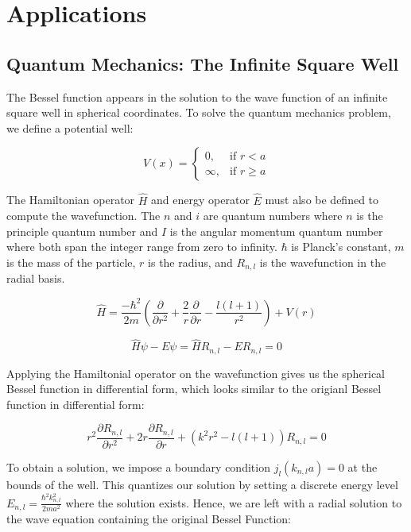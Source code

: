 \documentclass[linenumbers, RNAAS, trackchanges]{aastex631}
\begin{document}
\section{Applications} \label{sec:applications}

\subsection{Quantum Mechanics: The Infinite Square Well}
The Bessel function appears in the solution to the wave function of an infinite
square well in spherical coordinates. To solve the quantum mechanics problem, we
define a potential well:

\begin{equation}
    V(x)=
    \begin{cases}
        0, &\text{if }r < a\\
        \infty, &\text{if }r\geq a
    \end{cases}
\end{equation}

The Hamiltonian operator $\hat{H}$ and energy operator $\hat{E}$ must also be
defined to compute the wavefunction. The $n$ and $i$ are quantum numbers where $n$
is the principle quantum number and $I$ is the angular momentum quantum number where
both span the integer range from zero to infinity. $\hbar$ is Planck's constant, $m$
is the mass of the particle, $r$ is the radius, and $R_{n,l}$ is the wavefunction in
the radial basis.

\begin{equation}
    \hat{H}=\frac{-\hbar ^2}{2m}\left(\frac{\partial}{\partial r^2} + \frac{2}{r} \frac{\partial}{\partial r} - \frac{l(l+1)}{r^2}\right) +V(r)
\end{equation}

\begin{equation}
    \hat{H}\psi-E\psi=\hat{H}R_{n,l}-ER_{n,l}=0
\end{equation}

\noindent Applying the Hamiltonial operator on the wavefunction gives us the
spherical Bessel function in differential form, which looks similar to the
origianl Bessel function in differential form:

\begin{equation}
    r^2\frac{\partial R_{n,l}}{\partial r^2} + 2r\frac{\partial R_{n,l}}{\partial r} +(k^2r^2-l(l+1))R_{n,l}=0
\end{equation}

\noindent To obtain a solution, we impose a boundary condition $j_l(k_{n,l}a)=0$ at the
bounds of the well. This quantizes our solution by setting a discrete energy
level $E_{n,l}=\frac{\hbar^2k_{n,l}^2}{2ma^2}$ where the solution exists. Hence,
we are left with a radial solution to the wave equation containing the original
Bessel Function:
\end{document}
